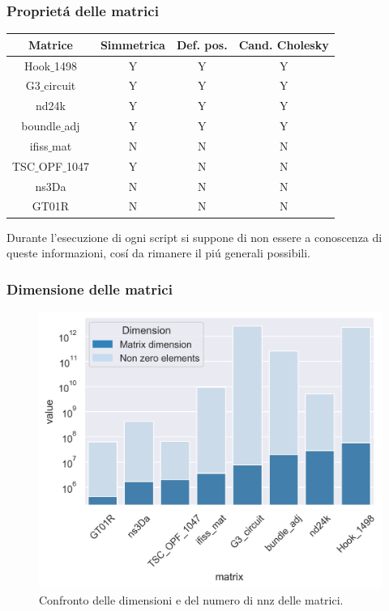\documentclass{beamer}
\begin{document}
\begin{frame}
\frametitle{Propriet\'a delle matrici}
\begin{table}
\begin{tabular}{c c c c}
\toprule
\textbf{Matrice} & \textbf{Simmetrica} & \textbf{Def. pos.} & \textbf{Cand. Cholesky}\\
\midrule
Hook$\_$1498 & Y & Y & Y\\
 G3$\_$circuit & Y & Y & Y\\
 nd24k & Y & Y & Y\\
 boundle$\_$adj & Y & Y & Y\\
 ifiss$\_$mat & N & N & N\\
 TSC$\_$OPF$\_$1047 & Y & N & N\\
 ns3Da & N & N & N\\
 GT01R & N & N & N \\
\bottomrule
\end{tabular}
\end{table}
Durante l'esecuzione di ogni script si suppone di non essere a conoscenza di queste informazioni, cos\'i da rimanere il pi\'u generali possibili.
\end{frame}

\begin{frame}
	\frametitle{Dimensione delle matrici}
	\begin{figure}
		\includegraphics[width=0.8\textheight]{assets/dimension2.jpg}
		\caption{Confronto delle dimensioni e del numero di nnz delle matrici.}
		\label{fig:dim}
	\end{figure}
\end{frame}
\end{document}
